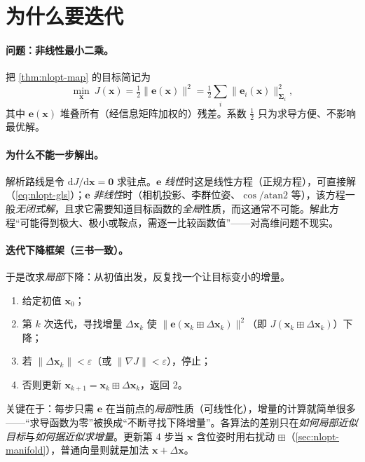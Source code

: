 \section{为什么要迭代}
\label{sec:nlopt-why}

\paragraph{问题：非线性最小二乘。}
把 \cref{thm:nlopt-map} 的目标简记为
\begin{equation}
  \min_{\mathbf{x}}\ J(\mathbf{x})=\tfrac12\big\|\mathbf{e}(\mathbf{x})\big\|^2=\tfrac12\sum_i\|\mathbf{e}_i(\mathbf{x})\|_{\boldsymbol{\Sigma}_i}^2,
  \label{eq:nls}
\end{equation}
其中 $\mathbf{e}(\mathbf{x})$ 堆叠所有（经信息矩阵加权的）残差。系数 $\tfrac12$ 只为求导方便、不影响最优解。

\paragraph{为什么不能一步解出。}
解析路线是令 $\mathrm{d}J/\mathrm{d}\mathbf{x}=\mathbf{0}$ 求驻点\cite{gaoxiang2019slam14}。$\mathbf{e}$ \emph{线性}时这是线性方程（正规方程），可直接解（\cref{eq:nlopt-gls}）；$\mathbf{e}$ \emph{非线性}时（相机投影、李群位姿、$\cos/\mathrm{atan2}$ 等），该方程一般\emph{无闭式解}，且求它需要知道目标函数的\emph{全局}性质，而这通常不可能。解此方程“可能得到极大、极小或鞍点，需逐一比较函数值”——对高维问题不现实。

\paragraph{迭代下降框架（三书一致）。}\cite{gaoxiang2019slam14,carlone2026handbook,barfoot2024state}
于是改求\emph{局部}下降：从初值出发，反复找一个让目标变小的增量。
\begin{enumerate}
  \item 给定初值 $\mathbf{x}_0$；
  \item 第 $k$ 次迭代，寻找增量 $\Delta\mathbf{x}_k$ 使 $\|\mathbf{e}(\mathbf{x}_k\boxplus\Delta\mathbf{x}_k)\|^2$（即 $J(\mathbf{x}_k\boxplus\Delta\mathbf{x}_k)$）下降；
  \item 若 $\|\Delta\mathbf{x}_k\|<\varepsilon$（或 $\|\nabla J\|<\varepsilon$），停止；
  \item 否则更新 $\mathbf{x}_{k+1}=\mathbf{x}_k\boxplus\Delta\mathbf{x}_k$，返回 2。
\end{enumerate}
关键在于：每步只需 $\mathbf{e}$ 在当前点的\emph{局部}性质（可线性化），增量的计算就简单很多——“求导函数为零”被换成“不断寻找下降增量”。各算法的差别只在\emph{如何局部近似目标}与\emph{如何据近似求增量}\cite{carlone2026handbook}。更新第 4 步当 $\mathbf{x}$ 含位姿时用右扰动 $\boxplus$（\cref{sec:nlopt-manifold}），普通向量则就是加法 $\mathbf{x}+\Delta\mathbf{x}$。

